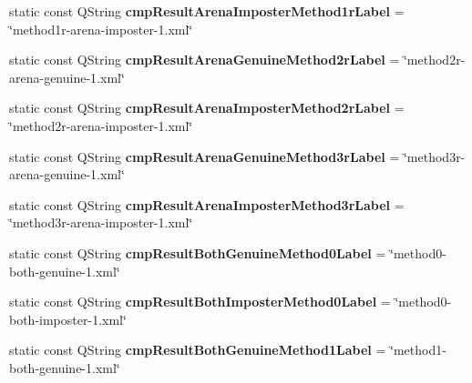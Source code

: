 \begin{DoxyCompactItemize}
\item 
\hypertarget{class_common_a181c2e26856e131e22bf1466510e55ac}{static const Q\+String {\bfseries cmp\+Result\+Arena\+Imposter\+Method1r\+Label} = \char`\"{}method1r-\/arena-\/imposter-\/1.xml\char`\"{}}\label{class_common_a181c2e26856e131e22bf1466510e55ac}

\item 
\hypertarget{class_common_a09462116d43df55b6e0c23d0d028b1c5}{static const Q\+String {\bfseries cmp\+Result\+Arena\+Genuine\+Method2r\+Label} = \char`\"{}method2r-\/arena-\/genuine-\/1.xml\char`\"{}}\label{class_common_a09462116d43df55b6e0c23d0d028b1c5}

\item 
\hypertarget{class_common_a14b60e26261ff93cef8e6b31aa92b364}{static const Q\+String {\bfseries cmp\+Result\+Arena\+Imposter\+Method2r\+Label} = \char`\"{}method2r-\/arena-\/imposter-\/1.xml\char`\"{}}\label{class_common_a14b60e26261ff93cef8e6b31aa92b364}

\item 
\hypertarget{class_common_ad5b639e453d7b371cc86f8d9169b5ad1}{static const Q\+String {\bfseries cmp\+Result\+Arena\+Genuine\+Method3r\+Label} = \char`\"{}method3r-\/arena-\/genuine-\/1.xml\char`\"{}}\label{class_common_ad5b639e453d7b371cc86f8d9169b5ad1}

\item 
\hypertarget{class_common_a86b4e632df8b7c1cb2fdb9009ee4fa29}{static const Q\+String {\bfseries cmp\+Result\+Arena\+Imposter\+Method3r\+Label} = \char`\"{}method3r-\/arena-\/imposter-\/1.xml\char`\"{}}\label{class_common_a86b4e632df8b7c1cb2fdb9009ee4fa29}

\item 
\hypertarget{class_common_ab45f2bcacfc00d46d2e5d22bc557deea}{static const Q\+String {\bfseries cmp\+Result\+Both\+Genuine\+Method0\+Label} = \char`\"{}method0-\/both-\/genuine-\/1.xml\char`\"{}}\label{class_common_ab45f2bcacfc00d46d2e5d22bc557deea}

\item 
\hypertarget{class_common_a872e59fbd3cd00f157e26d14305fdafd}{static const Q\+String {\bfseries cmp\+Result\+Both\+Imposter\+Method0\+Label} = \char`\"{}method0-\/both-\/imposter-\/1.xml\char`\"{}}\label{class_common_a872e59fbd3cd00f157e26d14305fdafd}

\item 
\hypertarget{class_common_a90abcc64167c0143a8a3992417bfa026}{static const Q\+String {\bfseries cmp\+Result\+Both\+Genuine\+Method1\+Label} = \char`\"{}method1-\/both-\/genuine-\/1.xml\char`\"{}}\label{class_common_a90abcc64167c0143a8a3992417bfa026}


\end{DoxyCompactItemize}
